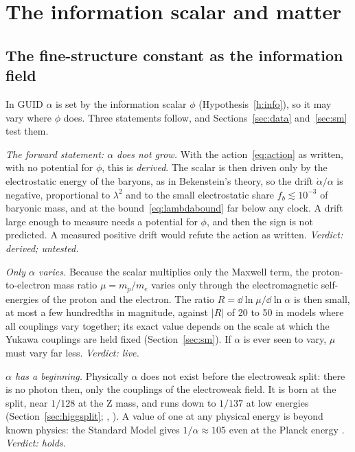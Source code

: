 \section{The information scalar and matter}\label{sec:matter}

\subsection{The fine-structure constant as the information field}\label{sec:alpha}

In GUID $\alpha$ is set by the information scalar $\phi$ (Hypothesis~\ref{h:info}), so it may vary where $\phi$ does. Three statements
follow, and Sections~\ref{sec:data} and~\ref{sec:sm} test them.

\emph{The forward statement: $\alpha$ does not grow.} With the action~\eqref{eq:action} as written, with no potential for $\phi$, this
is \emph{derived}. The scalar is then driven only by the electrostatic energy of the baryons, as in Bekenstein's theory, so the drift
$\dot\alpha/\alpha$ is negative, proportional to $\lambda^2$ and to the small electrostatic share $f_b\lesssim10^{-3}$ of baryonic mass,
and at the bound~\eqref{eq:lambdabound} far below any clock. A drift large enough to measure needs a potential for $\phi$, and then the
sign is not predicted. A measured positive drift would refute the action as written. \emph{Verdict: derived; untested.}

\emph{Only $\alpha$ varies.} Because the scalar multiplies only the Maxwell term, the proton-to-electron mass ratio $\mu=m_p/m_e$ varies
only through the electromagnetic self-energies of the proton and the electron. The ratio $R=\dd\ln\mu/\dd\ln\alpha$ is then small, at most
a few hundredths in magnitude, against $|R|$ of 20 to 50 in models where all couplings vary together; its exact value depends on the
scale at which the Yukawa couplings are held fixed (Section~\ref{sec:sm}). If $\alpha$ is ever seen to vary, $\mu$ must vary far less.
\emph{Verdict: live.}

\emph{$\alpha$ has a beginning.} Physically $\alpha$ does not exist before the electroweak split: there is no photon then, only the
couplings of the electroweak field. It is born at the split, near $1/128$ at the Z mass, and runs down to $1/137$ at low energies
(Section~\ref{sec:higgsplit}; , ). A value of one at any physical energy is beyond known physics: the Standard Model
gives $1/\alpha\approx105$ even at the Planck energy . \emph{Verdict: holds.}

